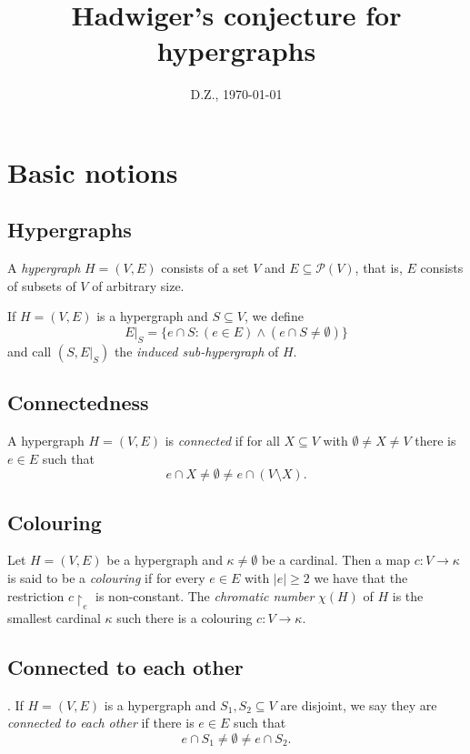\documentclass[12pt, a4paper]{amsart}
\begin{document}
\title{Hadwiger's conjecture for hypergraphs}
\author{D.Z., \today}
\maketitle
\section{Basic notions}
\subsection{Hypergraphs} A {\em hypergraph} $H=(V,E)$ consists of a
set $V$ and $E\subseteq {\mathcal P}(V)$, that is, $E$ 
consists of subsets of $V$ of arbitrary size. 

If $H = (V,E)$ is a hypergraph and $S\subseteq V$, we define
$$E|_S = \{e\cap S: (e\in E) \land (e\cap S \neq \emptyset)\}$$
and call $(S, E|_S)$ the {\em induced sub-hypergraph} of $H$.


\subsection{Connectedness} A hypergraph $H=(V,E)$ is {\em connected}
if for all $X \subseteq V$ with $\emptyset \neq X \neq V$ there
is $e\in E$ such that $$e\cap X \neq \emptyset \neq e
\cap (V\setminus X).$$

\subsection{Colouring} Let $H=(V,E)$ be a hypergraph and 
$\kappa\neq \emptyset$ be a cardinal.
Then a map $c:V\to \kappa$ is said to be a {\em colouring} if for
every $e\in E$ with $|e|\geq 2$ we have that
the restriction $c\restriction_e$ is non-constant. The {\em chromatic
number} $\chi(H)$ of $H$ is the smallest cardinal $\kappa$ such there
is a colouring $c:V\to \kappa$.

\subsection{Connected to each other}. If $H=(V,E)$ is a hypergraph
and $S_1, S_2\subseteq V$ are disjoint, we say they are {\em connected
to each other} if there is $e\in E$ such that $$e\cap S_1 \neq \emptyset
\neq e\cap S_2.$$

\end{document}
